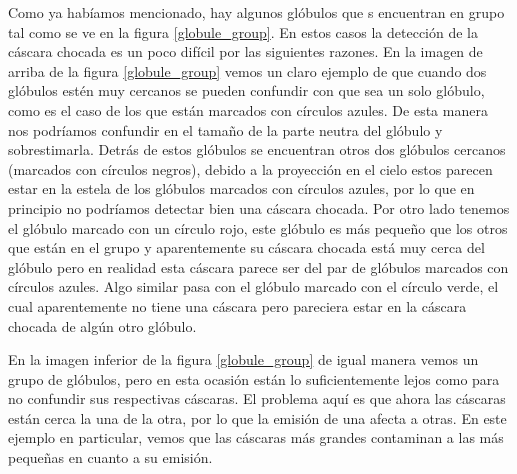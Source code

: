 \documentclass{book}
\begin{document}
Como ya habíamos mencionado, hay algunos glóbulos que s encuentran en grupo tal como se ve en la figura \ref{globule_group}. En estos casos la detección de la cáscara chocada es un poco difícil por las siguientes razones. En la imagen de arriba de la figura \ref{globule_group} vemos un claro ejemplo de que cuando dos glóbulos estén muy cercanos se pueden confundir con que sea un solo glóbulo, como es el caso de los que están marcados con círculos azules. De esta manera nos podríamos confundir en el tamaño de la parte neutra del glóbulo y sobrestimarla. Detrás de estos glóbulos se encuentran otros dos glóbulos cercanos (marcados con círculos negros), debido a la proyección en el cielo estos parecen estar en la estela de los glóbulos marcados con círculos azules, por lo que en principio no podríamos detectar bien una cáscara chocada. Por otro lado tenemos el glóbulo marcado con un círculo rojo, este glóbulo es más pequeño que los otros que están en el grupo y aparentemente su cáscara chocada está muy cerca del glóbulo pero en realidad esta cáscara parece ser del par de glóbulos marcados con círculos azules. Algo similar pasa con el glóbulo marcado con el círculo verde, el cual aparentemente no tiene una cáscara pero pareciera estar en la cáscara chocada de algún otro glóbulo.

En la imagen inferior de la figura \ref{globule_group} de igual manera vemos un grupo de glóbulos, pero en esta ocasión están lo suficientemente lejos como para no confundir sus respectivas cáscaras. El problema aquí es que ahora las cáscaras están cerca la una de la otra, por lo que la emisión de una afecta a otras. En este ejemplo en particular, vemos que las cáscaras más grandes contaminan a las más pequeñas en cuanto a su emisión.\\
\end{document}
